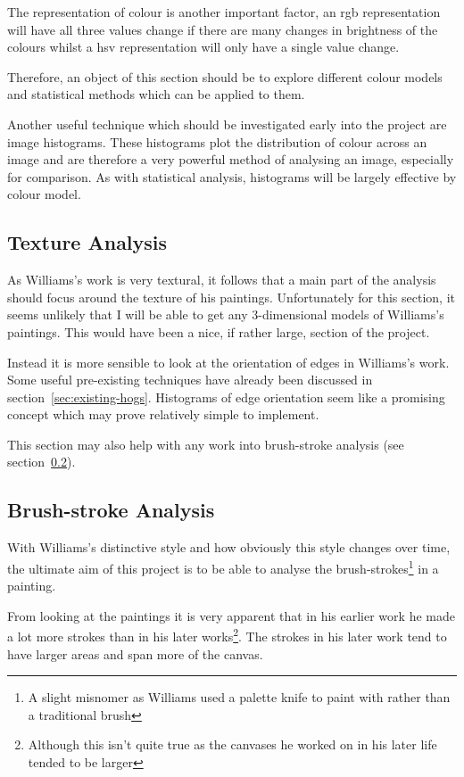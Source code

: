The representation of colour is another important factor, an \gls{rgb} representation will have all 
three values change if there are many changes in brightness of the colours whilst a \gls{hsv} 
representation will only have a single value change.

Therefore, an object of this section should be to explore different colour models and statistical
methods which can be applied to them.

Another useful technique which should be investigated early into the project are image histograms.
These histograms plot the distribution of colour across an image and are therefore a very powerful
method of analysing an image, especially for comparison. As with statistical analysis, histograms
will be largely effective by colour model.

\subsection{Texture Analysis}
As Williams's work is very textural, it follows that a main part of the analysis should
focus around the texture of his paintings. Unfortunately for this section, it seems unlikely that
I will be able to get any 3-dimensional models of Williams's paintings. This would have been a nice,
if rather large, section of the project.

Instead it is more sensible to look at the orientation of edges in Williams's work. Some useful 
pre-existing techniques have already been discussed in section~\ref{sec:existing-hogs}. Histograms
of edge orientation\cite{Dalal2005Histograms} seem like a promising concept which may prove 
relatively simple to implement.

This section may also help with any work into brush-stroke analysis (see 
section~\ref{sec:analysis-brush-stroke}).

\subsection{Brush-stroke Analysis}\label{sec:analysis-brush-stroke}
With Williams's distinctive style and how obviously this style changes over time, the ultimate aim 
of this project is to be able to analyse the brush-strokes\footnote{A slight misnomer as Williams 
used a palette knife to paint with rather than a traditional brush} in a painting.

From looking at the paintings it is very apparent that in his earlier work he made a lot more 
strokes than in his later works\footnote{Although this isn't quite true as the canvases he worked
on in his later life tended to be larger}. The strokes in his later work tend to have larger areas
and span more of the canvas.

